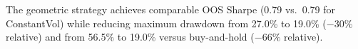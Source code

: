 The geometric strategy achieves comparable OOS Sharpe (0.79 vs.\ 0.79
for ConstantVol) while reducing maximum drawdown from 27.0\% to 19.0\%
($-30\%$ relative) and from 56.5\% to 19.0\% versus buy-and-hold
($-66\%$ relative).



%

%
